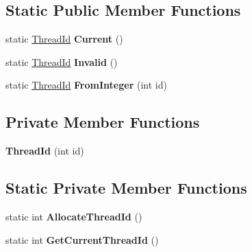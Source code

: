 \subsection*{Static Public Member Functions}
\begin{DoxyCompactItemize}
\item 
static \hyperlink{classv8_1_1internal_1_1_thread_id}{Thread\+Id} {\bfseries Current} ()\hypertarget{classv8_1_1internal_1_1_thread_id_a81c60d3524b03db2f154b7f682e7796f}{}\label{classv8_1_1internal_1_1_thread_id_a81c60d3524b03db2f154b7f682e7796f}

\item 
static \hyperlink{classv8_1_1internal_1_1_thread_id}{Thread\+Id} {\bfseries Invalid} ()\hypertarget{classv8_1_1internal_1_1_thread_id_a211793684e9dbeefb1165b8e547a448b}{}\label{classv8_1_1internal_1_1_thread_id_a211793684e9dbeefb1165b8e547a448b}

\item 
static \hyperlink{classv8_1_1internal_1_1_thread_id}{Thread\+Id} {\bfseries From\+Integer} (int id)\hypertarget{classv8_1_1internal_1_1_thread_id_ad4f2604e569a31908f37ebe26657ad60}{}\label{classv8_1_1internal_1_1_thread_id_ad4f2604e569a31908f37ebe26657ad60}

\end{DoxyCompactItemize}
\subsection*{Private Member Functions}
\begin{DoxyCompactItemize}
\item 
{\bfseries Thread\+Id} (int id)\hypertarget{classv8_1_1internal_1_1_thread_id_a955f52c2fccf7e24cd40d98c47c247d6}{}\label{classv8_1_1internal_1_1_thread_id_a955f52c2fccf7e24cd40d98c47c247d6}

\end{DoxyCompactItemize}
\subsection*{Static Private Member Functions}
\begin{DoxyCompactItemize}
\item 
static int {\bfseries Allocate\+Thread\+Id} ()\hypertarget{classv8_1_1internal_1_1_thread_id_a584d350a3a521fed2fc6b98eef777ccb}{}\label{classv8_1_1internal_1_1_thread_id_a584d350a3a521fed2fc6b98eef777ccb}

\item 
static int {\bfseries Get\+Current\+Thread\+Id} ()\hypertarget{classv8_1_1internal_1_1_thread_id_ab709a312c20734717256008500edb0ed}{}\label{classv8_1_1internal_1_1_thread_id_ab709a312c20734717256008500edb0ed}

\end{DoxyCompactItemize}
